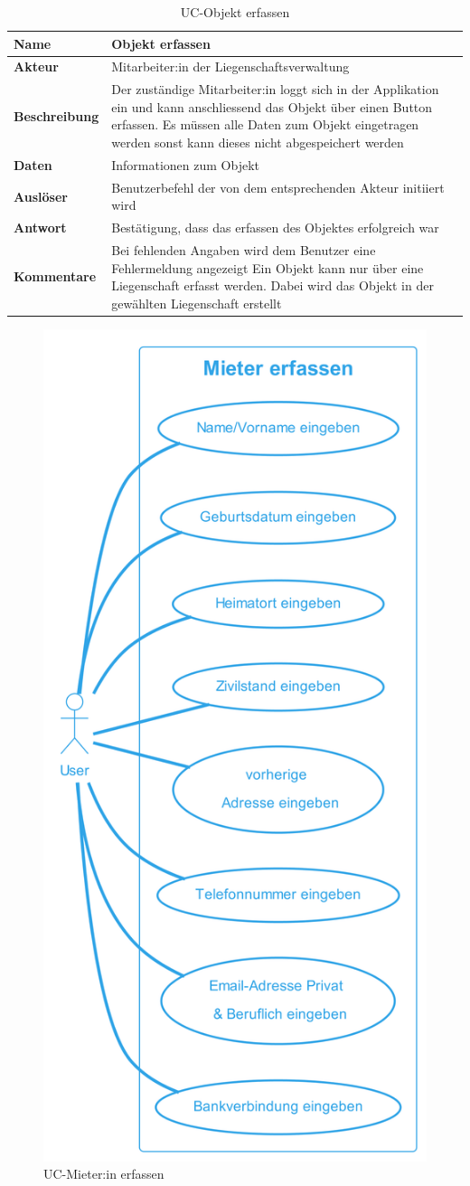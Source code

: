 \vspace*{-1cm}

\begin{table}[H]
  \centering
  \settowidth{}
  \setlength\extrarowheight{2pt}
  \begin{tabulary}{1.0\textwidth}{|a|m{14cm}|}
    \hline
    \textbf{Name}& Objekt erfassen\\
    \hline
    \textbf{Akteur}& Mitarbeiter:in der Liegenschaftsverwaltung\\
    \hline 
    \textbf{Beschreibung} & Der zuständige Mitarbeiter:in loggt sich in der Applikation ein und kann anschliessend das Objekt über einen Button erfassen. Es müssen alle Daten zum Objekt eingetragen werden sonst kann dieses nicht abgespeichert werden\\
    \hline
    \textbf{Daten} & Informationen zum Objekt\\
    \hline
    \textbf{Auslöser} & Benutzerbefehl der von dem entsprechenden Akteur initiiert wird\\
    \hline
    \textbf{Antwort} & Bestätigung, dass das erfassen des Objektes erfolgreich war\\
    \hline
    \textbf{Kommentare} & Bei fehlenden Angaben wird dem Benutzer eine Fehlermeldung angezeigt\newline 
    Ein Objekt kann nur über eine Liegenschaft erfasst werden. Dabei wird das Objekt in der gewählten Liegenschaft erstellt\\
    \hline
  \end{tabulary}
  \caption{UC-Objekt erfassen}
\end{table}

\begin{figure}[H]
  \begin{center}
    \includegraphics[width=0.4\linewidth]{content/diagrams/out/usecase/mieterErfassen/Mieter erfassen.png}
    \caption{UC-Mieter:in erfassen}
    \label{mieterErfassen}
  \end{center}
\end{figure}

